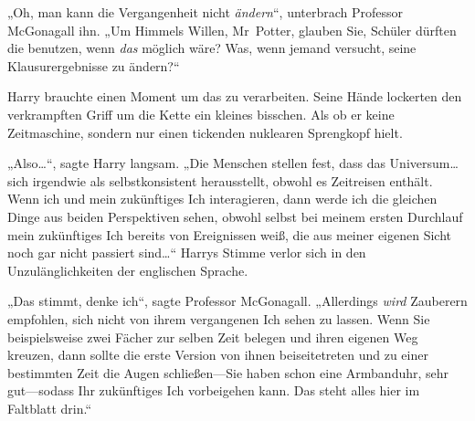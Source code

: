 „Oh, man kann die Vergangenheit nicht \emph{ändern}“, unterbrach Professor McGonagall ihn. „Um Himmels Willen, Mr~Potter, glauben Sie, Schüler dürften die benutzen, wenn \emph{das} möglich wäre? Was, wenn jemand versucht, seine Klausurergebnisse zu ändern?“

Harry brauchte einen Moment um das zu verarbeiten. Seine Hände lockerten den verkrampften Griff um die Kette ein kleines bisschen. Als ob er keine Zeitmaschine, sondern nur einen tickenden nuklearen Sprengkopf hielt.

„Also…“, sagte Harry langsam. „Die Menschen stellen fest, dass das Universum…sich irgendwie als selbstkonsistent herausstellt, obwohl es Zeitreisen enthält. Wenn ich und mein zukünftiges Ich interagieren, dann werde ich die gleichen Dinge aus beiden Perspektiven sehen, obwohl selbst bei meinem ersten Durchlauf mein zukünftiges Ich bereits von Ereignissen weiß, die aus meiner eigenen Sicht noch gar nicht passiert sind…“ Harrys Stimme verlor sich in den Unzulänglichkeiten der englischen Sprache.

„Das stimmt, denke ich“, sagte Professor McGonagall. „Allerdings \emph{wird} Zauberern empfohlen, sich nicht von ihrem vergangenen Ich sehen zu lassen. Wenn Sie beispielsweise zwei Fächer zur selben Zeit belegen und ihren eigenen Weg kreuzen, dann sollte die erste Version von ihnen beiseitetreten und zu einer bestimmten Zeit die Augen schließen—Sie haben schon eine Armbanduhr, sehr gut—sodass Ihr zukünftiges Ich vorbeigehen kann. Das steht alles hier im Faltblatt drin.“

